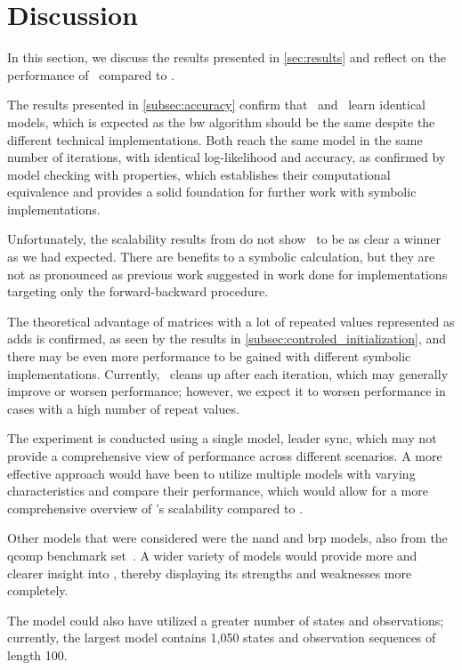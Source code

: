 \section{Discussion}\label{sec:discussion}
In this section, we discuss the results presented in \autoref{sec:results} and reflect on the performance of \Cupaal\ compared to \Jajapy.

The results presented in \autoref{subsec:accuracy} confirm that \Cupaal\ and \Jajapy\ learn identical models, which is expected as the \gls{bw} algorithm should be the same despite the different technical implementations.
Both reach the same model in the same number of iterations, with identical log-likelihood and accuracy, as confirmed by model checking with properties, which establishes their computational equivalence and provides a solid foundation for further work with symbolic implementations.

Unfortunately, the scalability results from  do not show \Cupaal\ to be as clear a winner as we had expected.
There are benefits to a symbolic calculation, but they are not as pronounced as previous work suggested in work done for implementations targeting only the forward-backward procedure.

The theoretical advantage of matrices with a lot of repeated values represented as \glspl{add} is confirmed, as seen by the results in \autoref{subsec:controled_initialization}, and there may be even more performance to be gained with different symbolic implementations.
Currently, \Cupaal\ cleans up after each iteration, which may generally improve or worsen performance; however, we expect it to worsen performance in cases with a high number of repeat values.

The experiment is conducted using a single model, leader sync, which may not provide a comprehensive view of performance across different scenarios.
A more effective approach would have been to utilize multiple models with varying characteristics and compare their performance, which would allow for a more comprehensive overview of \Cupaal's scalability compared to \Jajapy.

Other models that were considered were the \gls{nand} and \gls{brp} models, also from the qcomp benchmark set~\cite{hartmanns2019quantitative}.
A wider variety of models would provide more and clearer insight into \Cupaal, thereby displaying its strengths and weaknesses more completely.

The model could also have utilized a greater number of states and observations; currently, the largest model contains 1,050 states and observation sequences of length 100.

